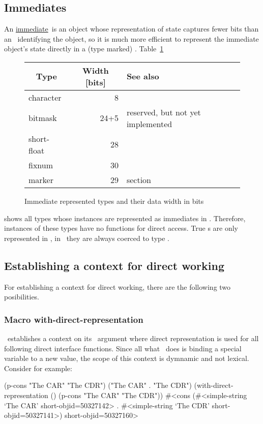 \subsection{Immediates}

An \hyperlink{link:Immediate}{immediate}\ is an object whose
representation of state captures fewer bits than an \objid\ 
identifying the object, so it is much more efficient to represent the
immediate object's state directly in a
(type marked) \objid. Table~\ref{tab:Immediates} %
\begin{figure}[htbp]\centering
\begin{tabular}{|l|r|l|}
\hline
\multicolumn{1}{|c|}{\textbf{Type}}
        &\multicolumn{1}{c|}{\textbf{Width [bits]}}
        &\textbf{See also}\\
\hline
\hline
character       &    8 & \\
bitmask         & 24+5 & reserved, but not yet implemented\\
short-float     &   28 & \\
fixnum          &   30 & \\
marker          &   29 & section \Nameref{sec:Markers}\\
\hline
\end{tabular}
\caption{Immediate represented types and their data width in bits}%
\label{tab:Immediates}
\end{figure}
shows all types whose instances are represented as immediates in
\plobwoexcl. Therefore, instances of these types have no functions for
direct access. True \class{short-float}s are only represented in
\lwcl, in \allegrocl\ they are always coerced to type
.

\subsection{Establishing a context for direct working}

For establishing a context for direct working, there are the following
two posibilities.

\subsubsection{Macro \textbf{with-direct-representation}}

\ establishes a context on its
\funarg{forms}\ argument where direct representation is used for all
following direct interface functions. Since all what
\ does is binding a special variable
to a new value, the scope of this context is dymnamic and not
lexical.
Consider for example:
\begin{IndentedCompactCode}
\listener{}(p-cons "The CAR" "The CDR")\marginnumber{\smalloi}
("The CAR" . "The CDR")
\listener{}(with-direct-representation () (p-cons "The CAR" "The CDR"))\marginnumber{\smalloii}
#<cons (#<simple-string `The CAR' short-objid=50327142> .
        #<simple-string `The CDR' short-objid=50327141>)
        short-objid=50327160>
\end{IndentedCompactCode}

